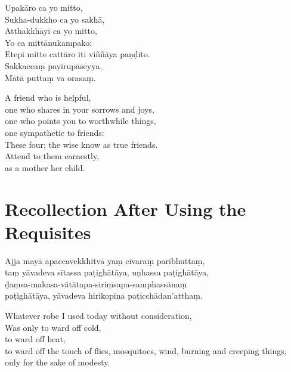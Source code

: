 Upakāro ca yo mitto,\\
Sukha-dukkho ca yo sakhā,\\
Atthakkhāyī ca yo mitto,\\
Yo ca mittānukampako:\\
Etepi mitte cattāro iti viññāya paṇḍito.\\
Sakkaccaṃ payirupāseyya,\\
Mātā puttaṃ va orasaṃ.

\begin{english}
  A friend who is helpful,\\
  one who shares in your sorrows and joys,\\
  one who points you to worthwhile things,\\
  one sympathetic to friends:\\
  These four; the wise know as true friends.\\
  Attend to them earnestly,\\
  as a mother her child.
\end{english}

\section{Recollection After Using the Requisites}
\label{recollection-after-using}

\begin{leader}
\end{leader}


Ajja mayā apaccavekkhitvā yaṃ cīvaraṃ paribhuttaṃ,\\
taṃ yāvadeva sītassa paṭighātāya, uṇhassa paṭighātāya,\\
ḍaṃsa-makasa-vātātapa-siriṃsapa-samphassānaṃ\\
paṭighātāya, yāvadeva hirikopina paṭicchādan'atthaṃ.

\begin{english}
  Whatever robe I used today without consideration,\\
  Was only to ward off cold,\\
  to ward off heat,\\
  to ward off the touch of flies, mosquitoes, wind, burning and creeping things,\\
  only for the sake of modesty.
\end{english}

